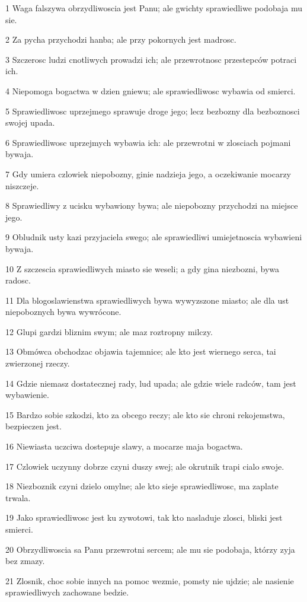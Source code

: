 \par 1 Waga falszywa obrzydliwoscia jest Panu; ale gwichty sprawiedliwe podobaja mu sie.
\par 2 Za pycha przychodzi hanba; ale przy pokornych jest madrosc.
\par 3 Szczerosc ludzi cnotliwych prowadzi ich; ale przewrotnosc przestepców potraci ich.
\par 4 Niepomoga bogactwa w dzien gniewu; ale sprawiedliwosc wybawia od smierci.
\par 5 Sprawiedliwosc uprzejmego sprawuje droge jego; lecz bezbozny dla bezboznosci swojej upada.
\par 6 Sprawiedliwosc uprzejmych wybawia ich: ale przewrotni w zlosciach pojmani bywaja.
\par 7 Gdy umiera czlowiek niepobozny, ginie nadzieja jego, a oczekiwanie mocarzy niszczeje.
\par 8 Sprawiedliwy z ucisku wybawiony bywa; ale niepobozny przychodzi na miejsce jego.
\par 9 Obludnik usty kazi przyjaciela swego; ale sprawiedliwi umiejetnoscia wybawieni bywaja.
\par 10 Z szczescia sprawiedliwych miasto sie weseli; a gdy gina niezbozni, bywa radosc.
\par 11 Dla blogoslawienstwa sprawiedliwych bywa wywyzszone miasto; ale dla ust niepoboznych bywa wywrócone.
\par 12 Glupi gardzi bliznim swym; ale maz roztropny milczy.
\par 13 Obmówca obchodzac objawia tajemnice; ale kto jest wiernego serca, tai zwierzonej rzeczy.
\par 14 Gdzie niemasz dostatecznej rady, lud upada; ale gdzie wiele radców, tam jest wybawienie.
\par 15 Bardzo sobie szkodzi, kto za obcego reczy; ale kto sie chroni rekojemstwa, bezpieczen jest.
\par 16 Niewiasta uczciwa dostepuje slawy, a mocarze maja bogactwa.
\par 17 Czlowiek uczynny dobrze czyni duszy swej; ale okrutnik trapi cialo swoje.
\par 18 Niezboznik czyni dzielo omylne; ale kto sieje sprawiedliwosc, ma zaplate trwala.
\par 19 Jako sprawiedliwosc jest ku zywotowi, tak kto nasladuje zlosci, bliski jest smierci.
\par 20 Obrzydliwoscia sa Panu przewrotni sercem; ale mu sie podobaja, którzy zyja bez zmazy.
\par 21 Zlosnik, choc sobie innych na pomoc wezmie, pomsty nie ujdzie; ale nasienie sprawiedliwych zachowane bedzie.
